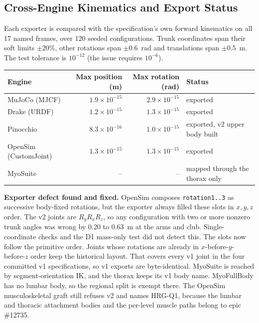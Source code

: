 \documentclass[11pt,a4paper]{article}
\begin{document}
\subsection{Cross-Engine Kinematics and Export Status}
Each exporter is compared with the specification's own forward kinematics
on all 17 named frames, over 120 seeded configurations. Trunk coordinates
span their soft limits $\pm20\%$, other rotations span $\pm0.6$~rad and
translations span $\pm0.5$~m. The test tolerance is $10^{-12}$ (the issue
requires $10^{-6}$).
\begin{center}
\begin{tabular}{lrrl}
Engine & Max position (m) & Max rotation (rad) & Status \\
\hline
MuJoCo (MJCF) & $1.9\times10^{-15}$ & $2.9\times10^{-15}$ & exported \\
Drake (URDF) & $1.2\times10^{-15}$ & $1.3\times10^{-15}$ & exported \\
Pinocchio & $8.3\times10^{-16}$ & $1.0\times10^{-15}$ & exported, v2 upper body built \\
OpenSim (CustomJoint) & $1.3\times10^{-15}$ & $1.3\times10^{-15}$ & exported \\
MyoSuite & -- & -- & mapped through the thorax only \\
\end{tabular}
\end{center}
\textbf{Exporter defect found and fixed.} OpenSim composes
\texttt{rotation1..3} as successive body-fixed rotations, but the exporter
always filled these slots in $x,y,z$ order. The v2 joints are
$R_yR_xR_z$, so any configuration with two or more nonzero trunk angles was
wrong by 0.20 to 0.63~m at the arms and club. Single-coordinate checks and
the D1 mass-only test did not detect this. The slots now follow the
primitive order. Joints whose rotations are already in $x$-before-$y$-before-$z$
order keep the historical layout. That covers every v1 joint in the four
committed v1 specifications, so v1 exports are byte-identical. MyoSuite is
reached by segment-orientation IK, and the thorax keeps its v1 body name.
MyoFullBody has no lumbar body, so the regional split is exempt there. The
OpenSim musculoskeletal graft still refuses v2 and names HRG-Q1, because the
lumbar and thoracic attachment bodies and the per-level muscle paths belong
to epic \#12735.
\end{document}
